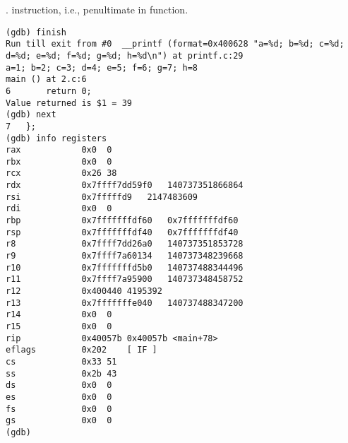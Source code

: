 .
\RIP {} 
{ instruction, i.e., penultimate in \main function}.

\begin{lstlisting}
(gdb) finish
Run till exit from #0  __printf (format=0x400628 "a=%d; b=%d; c=%d; d=%d; e=%d; f=%d; g=%d; h=%d\n") at printf.c:29
a=1; b=2; c=3; d=4; e=5; f=6; g=7; h=8
main () at 2.c:6
6		return 0;
Value returned is $1 = 39
(gdb) next
7	};
(gdb) info registers
rax            0x0	0
rbx            0x0	0
rcx            0x26	38
rdx            0x7ffff7dd59f0	140737351866864
rsi            0x7fffffd9	2147483609
rdi            0x0	0
rbp            0x7fffffffdf60	0x7fffffffdf60
rsp            0x7fffffffdf40	0x7fffffffdf40
r8             0x7ffff7dd26a0	140737351853728
r9             0x7ffff7a60134	140737348239668
r10            0x7fffffffd5b0	140737488344496
r11            0x7ffff7a95900	140737348458752
r12            0x400440	4195392
r13            0x7fffffffe040	140737488347200
r14            0x0	0
r15            0x0	0
rip            0x40057b	0x40057b <main+78>
eflags         0x202	[ IF ]
cs             0x33	51
ss             0x2b	43
ds             0x0	0
es             0x0	0
fs             0x0	0
gs             0x0	0
(gdb) 
\end{lstlisting}

